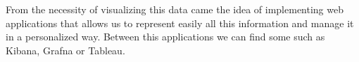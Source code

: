 \documentclass[a4paper, 12pt, english]{book}
\begin{document}
From the necessity of visualizing this data came the idea of implementing web applications that allows us to represent easily all this information and manage it in a personalized way. Between this applications we can find some such as Kibana, Grafna or Tableau.









\end{document}
